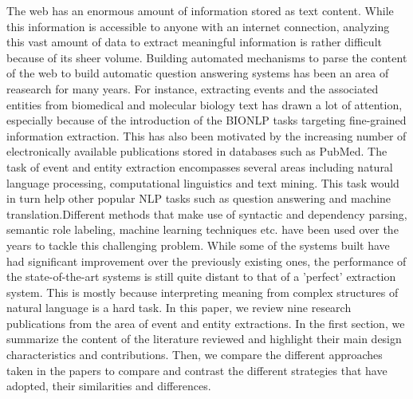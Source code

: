 The web has an enormous amount of information stored as text content. While this information is accessible to anyone with an internet connection, analyzing this vast amount of data to extract meaningful information is rather difficult because of its sheer volume. Building automated mechanisms to parse the content of the web to build automatic question answering systems has been an area of reasearch for many years. For instance, extracting events and the associated entities from biomedical and molecular biology text has drawn a lot of attention, especially because of the introduction of the BIONLP tasks targeting fine-grained information extraction. This has also been motivated by the increasing number of electronically available publications stored in databases such as PubMed. The task of event and entity extraction encompasses several areas including natural language processing, computational linguistics and text mining. This task would in turn help other popular NLP tasks such as question answering and machine translation.Different methods that make use of syntactic and dependency parsing, semantic role labeling, machine learning techniques etc. have been used over the years to tackle this challenging problem. While some of the systems built have had significant improvement over the previously existing ones, the performance of the state-of-the-art systems is still quite distant to that of a 'perfect' extraction system. This is mostly because interpreting meaning from complex structures of natural language is a hard task. In this paper, we review nine research publications from the area of event and entity extractions. In the first section, we summarize the content of the literature reviewed and highlight their main design characteristics and contributions. Then, we compare the different approaches taken in the papers to compare and contrast the different strategies that have adopted, their similarities and differences.